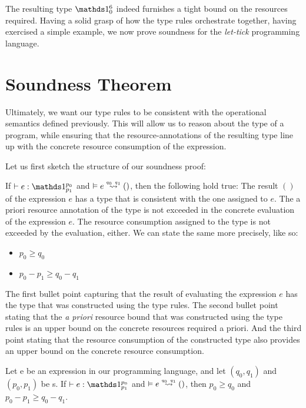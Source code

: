 The resulting type \(\ratype{\unit}{6}{0}\) indeed furnishes a tight bound on the resources required. Having a solid grasp of how the type rules orchestrate together, having exercised a simple example, we now prove soundness for the \emph{let-tick} programming language.


\section{Soundness Theorem}
Ultimately, we want our type rules to be consistent with the operational semantics defined previously. This will allow us to reason about the type of a program, while ensuring that the resource-annotations of the resulting type line up with the concrete resource consumption of the expression.

Let us first sketch the structure of our soundness proof:

If \(\typing{}{e}{\ratype{\unit}{p_0}{p_1}}\) and \(\evals{}{e}{()}{q_0}{q_1}\), then the following hold true:
The result \(()\) of the expression \(e\) has a type that is consistent with the one assigned to \(e\). The a priori resource annotation of the type is not exceeded in the concrete evaluation of the expression \(e\). The resource consumption assigned to the type is not exceeded by the evaluation, either. We can state the same more precisely, like so: 

\begin{itemize}
   \item \(p_0 \geq q_0\)     
   \item \(p_0 - p_1 \geq q_0 - q_1\)
\end{itemize}

The first bullet point capturing that the result of evaluating the expression \(e\) has the type that was constructed using the type rules. The second bullet point stating that the \emph{a priori} resource bound that was constructed using the type rules is an upper bound on the concrete resources required a priori. And the third point stating that the resource consumption of the constructed type also provides an upper bound on the concrete resource consumption.

\begin{theorem}
   Let e be an expression in our programming language, and let \((q_0, q_1)\) and \((p_0, p_1)\) be s. If \(\typing{}{e}{\ratype{\unit}{p_0}{p_1}}\) and \(\evals{}{e}{()}{q_0}{q_1}\), then \(p_0 \geq q_0\) and \(p_0 - p_1 \geq q_0 - q_1\).
\end{theorem}


